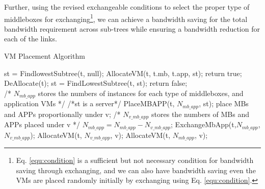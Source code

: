 \documentclass[review]{elsarticle}
\begin{document}
Further, using the revised exchangeable conditions to select the proper type of middleboxes for exchanging\footnote{Eq. \ref{equ:condition} is a sufficient but not necessary condition for bandwidth saving through exchanging, and we can also have bandwidth saving even the VMs are placed randomly initially by exchanging using Eq. \ref{equ:condition}.}, we can achieve a bandwidth saving for the total bandwidth requirement across sub-trees while ensuring a bandwidth reduction for each of the links.%

\begin{algorithm}%
	\caption{VM Placement Algorithm}
	\label{alg1}
	\begin{algorithmic}[1]
		\State st = FindlowestSubtree(t, null);
		\State AllocateVM(t, t.mb, t.app, st);
		\State return true;
		\EndIf 
		\State DeAllocate(t);
		\State st = FindLowestSubtree(t, st);
		\EndWhile
		\State return false;
		\EndFunction
		\\
		/* $N_{mb\_app}$ stores the numbers of instances for 
		\State each type of middleboxes, and application VMs */
		 /*st is a server*/
		\State PlaceMBAPP(t, $N_{mb\_app}$, st);
		\Else
		\State place
		MBs and APPs \State proportionally under v;
		\State /* $N_{v\_mb\_app}$ stores the numbers of 
		\State MBs and APPs placed under v */
		\State $N_{mb\_app} = N_{mb\_app} - N_{v\_mb\_app}$;
		\State ExchangeMbApp(t,$N_{mb\_app}$,$N_{v\_mb\_app}$);
		\State AllocateVM(t, $N_{v\_mb\_app}$, v);
		\Else
		\State AllocateVM(t, $N_{mb\_app}$, v);
		\EndIf
		\EndIf
		\EndFor
		\EndIf
		\EndFunction %
	\end{algorithmic}
\end{algorithm}
\end{document}
